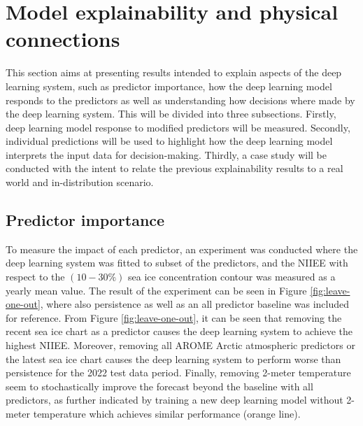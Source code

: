 \documentclass[../main/thesis.tex]{subfiles}
\begin{document}
\section{Model explainability and physical connections}
\label{sec:physical-connections}
This section aims at presenting results intended to explain aspects of the deep learning system, such as predictor importance, how the deep learning model responds to the predictors as well as understanding how decisions where made by the deep learning system. This will be divided into three subsections. Firstly, deep learning model response to modified predictors will be measured. Secondly, individual predictions will be used to highlight how the deep learning model interprets the input data for decision-making. Thirdly, a case study will be conducted with the intent to relate the previous explainability results to a real world and in-distribution scenario.

\subsection{Predictor importance}
\label{sec:predictor-importance}
To measure the impact of each predictor, an experiment was conducted where the deep learning system was fitted to subset of the predictors, and the NIIEE with respect to the $(10 - 30\%)$ sea ice concentration contour was measured as a yearly mean value. The result of the experiment can be seen in Figure \ref{fig:leave-one-out}, where also persistence as well as an all predictor baseline was included for reference. From Figure \ref{fig:leave-one-out}, it can be seen that removing the recent sea ice chart as a predictor causes the deep learning system to achieve the highest NIIEE. Moreover, removing all AROME Arctic atmospheric predictors or the latest sea ice chart causes the deep learning system to perform worse than persistence for the 2022 test data period. Finally, removing 2-meter temperature seem to stochastically improve the forecast beyond the baseline with all predictors, as further indicated by training a new deep learning model without 2-meter temperature which achieves similar performance (orange line). 
\end{document}
